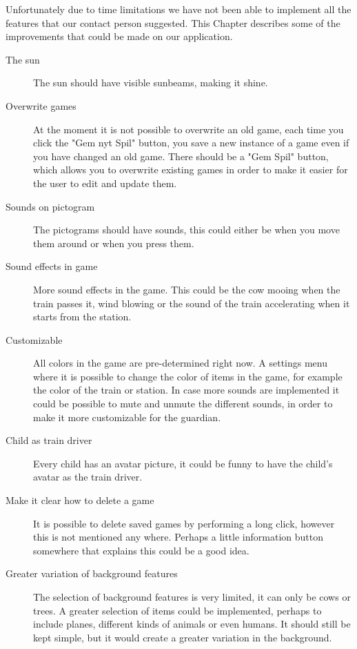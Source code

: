 Unfortunately due to time limitations we have not been able to implement all the features that our contact person suggested. This Chapter describes some of the improvements that could be made on our application.

\begin{description}
\item[The sun] The sun should have visible sunbeams, making it shine. 

\item[Overwrite games] At the moment it is not possible to overwrite an old game, each time you click the "Gem nyt Spil" button, you save a new instance of a game even if you have changed an old game. There should be a "Gem Spil" button, which allows you to overwrite existing games in order to make it easier for the user to edit and update them.

\item[Sounds on pictogram] The pictograms should have sounds, this could either be when you move them around or when you press them. 

\item[Sound effects in game] More sound effects in the game. This could be the cow mooing when the train passes it, wind blowing or the sound of the train accelerating when it starts from the station.

\item[Customizable] All colors in the game are pre-determined right now. A settings menu where it is possible to change the color of items in the game, for example the color of the train or station. In case more sounds are implemented it could be possible to mute and unmute the different sounds, in order to make it more customizable for the guardian.

\item[Child as train driver] Every child has an avatar picture, it could be funny to have the child's avatar as the train driver. 

\item[Make it clear how to delete a game] It is possible to delete saved games by performing a long click, however this is not mentioned any where. Perhaps a little information button somewhere that explains this could be a good idea. 

\item[Greater variation of background features] The selection of background features is very limited, it can only be cows or trees. A greater selection of items could be implemented, perhaps to include planes, different kinds of animals or even humans. It should still be kept simple, but it would create a greater variation in the background. 


\end{description}
